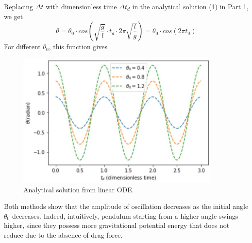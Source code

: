 \documentclass{article}
\begin{document}
\noindent Replacing $\Delta t$ with dimensionless time $\Delta t_d$ in the analytical solution (1) in Part 1, we get
\[\theta=\theta_0\cdot cos(\sqrt{\frac{g}{l}}\cdot t_d \cdot 2\pi\sqrt{\frac{l}{g}})=\theta_0\cdot cos(2\pi t_d) \tag{4}\]
For different $\theta_0$, this function gives
\begin{figure}[H]
\includegraphics[width=4in]{SimpleAnalyticalDifferentTheta0.jpg}
\caption{Analytical solution from linear ODE.}
\end{figure}
\noindent Both methods show that the amplitude of oscillation decreases as the initial angle $\theta_0$ decreases. Indeed, intuitively, pendulum starting from a higher angle swings higher, since they possess more gravitational potential energy that does not reduce due to the absence of drag force.
\end{document}

